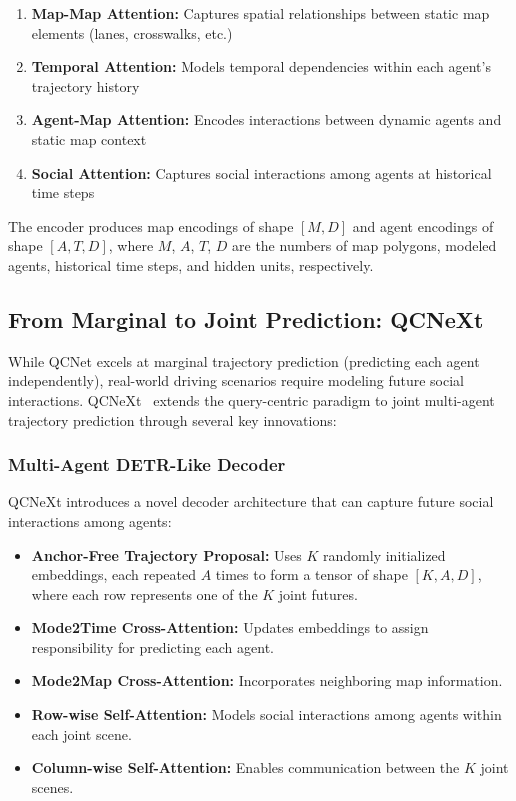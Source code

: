 \begin{enumerate}
    \item \textbf{Map-Map Attention:} Captures spatial relationships between static map elements (lanes, crosswalks, etc.)
    \item \textbf{Temporal Attention:} Models temporal dependencies within each agent's trajectory history
    \item \textbf{Agent-Map Attention:} Encodes interactions between dynamic agents and static map context
    \item \textbf{Social Attention:} Captures social interactions among agents at historical time steps
\end{enumerate}

The encoder produces map encodings of shape $[M, D]$ and agent encodings of shape $[A, T, D]$, where $M$, $A$, $T$, $D$ are the numbers of map polygons, modeled agents, historical time steps, and hidden units, respectively.

\subsection{From Marginal to Joint Prediction: QCNeXt}
While QCNet excels at marginal trajectory prediction (predicting each agent independently), real-world driving scenarios require modeling future social interactions. QCNeXt~\cite{qcnextZhou2023} extends the query-centric paradigm to joint multi-agent trajectory prediction through several key innovations:

\subsubsection{Multi-Agent DETR-Like Decoder}
QCNeXt introduces a novel decoder architecture that can capture future social interactions among agents:

\begin{itemize}
    \item \textbf{Anchor-Free Trajectory Proposal:} Uses $K$ randomly initialized embeddings, each repeated $A$ times to form a tensor of shape $[K, A, D]$, where each row represents one of the $K$ joint futures.
    \item \textbf{Mode2Time Cross-Attention:} Updates embeddings to assign responsibility for predicting each agent.
    \item \textbf{Mode2Map Cross-Attention:} Incorporates neighboring map information.
    \item \textbf{Row-wise Self-Attention:} Models social interactions among agents within each joint scene.
    \item \textbf{Column-wise Self-Attention:} Enables communication between the $K$ joint scenes.
\end{itemize}

